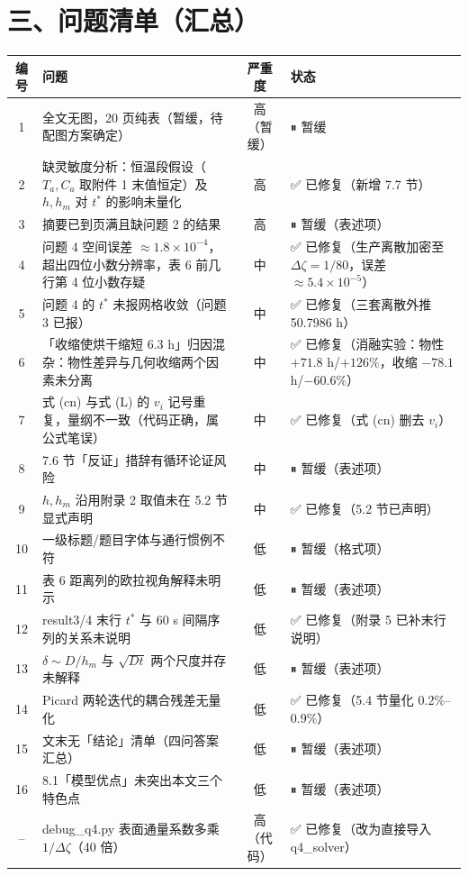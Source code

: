 \documentclass[12pt,a4paper]{ctexart}
\begin{document}
\section{三、问题清单（汇总）}

\begin{center}
{\begin{tabular}{clcl}
\toprule
编号 & 问题 & 严重度 & 状态 \\
\midrule
1 & 全文无图，20 页纯表（暂缓，待配图方案确定） & 高（暂缓） & ⏸ 暂缓 \\
2 & 缺灵敏度分析：恒温段假设（$T_a,C_a$ 取附件 1 末值恒定）及 $h,h_m$ 对 $t^*$ 的影响未量化 & 高 & ✅ 已修复（新增 7.7 节） \\
3 & 摘要已到页满且缺问题 2 的结果 & 高 & ⏸ 暂缓（表述项） \\
4 & 问题 4 空间误差 $\approx1.8\times10^{-4}$，超出四位小数分辨率，表 6 前几行第 4 位小数存疑 & 中 & ✅ 已修复（生产离散加密至 $\Delta\zeta=1/80$，误差 $\approx5.4\times10^{-5}$） \\
5 & 问题 4 的 $t^*$ 未报网格收敛（问题 3 已报） & 中 & ✅ 已修复（三套离散外推 50.7986 h） \\
6 & 「收缩使烘干缩短 6.3 h」归因混杂：物性差异与几何收缩两个因素未分离 & 中 & ✅ 已修复（消融实验：物性 $+71.8$ h/$+126\%$，收缩 $-78.1$ h/$-60.6\%$） \\
7 & 式 (cn) 与式 (L) 的 $v_i$ 记号重复，量纲不一致（代码正确，属公式笔误） & 中 & ✅ 已修复（式 (cn) 删去 $v_i$） \\
8 & 7.6 节「反证」措辞有循环论证风险 & 中 & ⏸ 暂缓（表述项） \\
9 & $h,h_m$ 沿用附录 2 取值未在 5.2 节显式声明 & 中 & ✅ 已修复（5.2 节已声明） \\
10 & 一级标题/题目字体与通行惯例不符 & 低 & ⏸ 暂缓（格式项） \\
11 & 表 6 距离列的欧拉视角解释未明示 & 低 & ⏸ 暂缓（表述项） \\
12 & result3/4 末行 $t^*$ 与 60 s 间隔序列的关系未说明 & 低 & ✅ 已修复（附录 5 已补末行说明） \\
13 & $\delta\sim D/h_m$ 与 $\sqrt{Dt}$ 两个尺度并存未解释 & 低 & ⏸ 暂缓（表述项） \\
14 & Picard 两轮迭代的耦合残差无量化 & 低 & ✅ 已修复（5.4 节量化 0.2\%--0.9\%） \\
15 & 文末无「结论」清单（四问答案汇总） & 低 & ⏸ 暂缓（表述项） \\
16 & 8.1「模型优点」未突出本文三个特色点 & 低 & ⏸ 暂缓（表述项） \\
-- & debug\_q4.py 表面通量系数多乘 $1/\Delta\zeta$（40 倍） & 高（代码） & ✅ 已修复（改为直接导入 q4\_solver） \\
\bottomrule
\end{tabular}}
\end{center}
\end{document}
